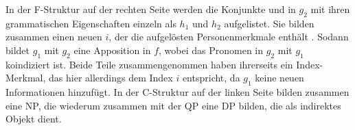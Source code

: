 In der F-Struktur auf der rechten Seite werden die
Konjunkte   und   in $g_2$ mit ihren
grammatischen Eigenschaften einzeln als $h_1$ und $h_2$ aufgelistet. Sie bilden
zusammen einen neuen  $i$, der die aufgelösten
Personenmerkmale enthält%
. Sodann bildet $g_1$ mit $g_2$ eine Apposition in $f$, wobei
das Pronomen  in $g_2$ mit $g_1$ koindiziert
ist. Beide Teile zusammengenommen haben ihrerseits ein Index-Merkmal, das hier
allerdings dem Index $i$ entspricht, da $g_1$ keine neuen Informationen
hinzufügt. In der C-Struktur auf der linken Seite
bilden   zusammen eine
NP, die wiederum zusammen mit der QP
 eine DP bilden, die als indirektes Objekt
dient.

